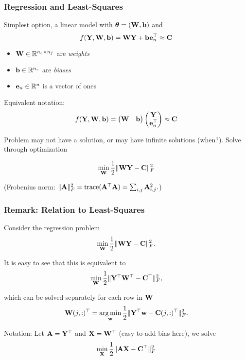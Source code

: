 \documentclass[12pt,fleqn,handout]{beamer}
\begin{document}
\begin{frame}\frametitle{Regression and Least-Squares}

Simplest option, a linear model with ${\boldsymbol \theta} = ({\bf W},{\bf b})$ and
$$ f({\bf Y},{\bf W},{\bf b}) =  {\bf W} {\bf Y} + {\bf b} {\bf e}_n^\top \approx {\bf C} $$
\begin{itemize}
	\item ${\bf W} \in \mathbb{R}^{n_c \times n_f}$ are \emph{weights}
	\item ${\bf b} \in \mathbb{R}^{n_c}$ are \emph{biases}
	\item ${\bf e}_n \in \mathbb{R}{^n}$ is a vector of ones
\end{itemize} 
\pause
Equivalent notation:
$$f({\bf Y},{\bf W},{\bf b}) = \begin{pmatrix} {\bf W} & {\bf b} \end{pmatrix} \begin{pmatrix} {\bf Y} \\ {\bf e}_n^\top \end{pmatrix} \approx {\bf C}$$

\pause

Problem may not have a solution, or may have infinite solutions (when?).
Solve through optimization
 
$$ \min_{{\bf W}} {\frac 12} \|{\bf W} {\bf Y} - {\bf C}\|^2_F $$

(Frobenius norm: $\|{\bf A}\|_F^2 = {\rm trace}({\bf A}^{\top} {\bf A}) = \sum_{i,j} {\bf A}_{i,j}^2. $)

\end{frame}

\begin{frame}
	\frametitle{Remark: Relation to Least-Squares}
	
	Consider the regression problem
	$$ \min_{{\bf W}} {\frac 12} \|{\bf W} {\bf Y} - {\bf C}\|^2_F. $$
	
	It is easy to see that this is equivalent to
	$$ \min_{{\bf W}} {\frac 12} \| {\bf Y}^\top {\bf W}^\top - {\bf C}^\top\|^2_F, $$
	
	which can be solved separately for each row in ${\bf W}$
	$$
	{\bf W}(j,:)^\top = \operatorname*{arg\,min}_{{\bf w}} {\frac 12} \| {\bf Y}^\top {\bf w} - {\bf C}(j,:)^\top\|^2_F.
	$$
	
	Notation: Let ${\bf A} = {\bf Y}^\top$ and ${\bf X} = {\bf W}^\top$ (easy to add bias here), we solve
	$$
		\min_{\bf X} {\frac 12} \| {\bf A} {\bf X} - {\bf C}^\top \|^2_F
	$$
		
\end{frame} 
\end{document}
